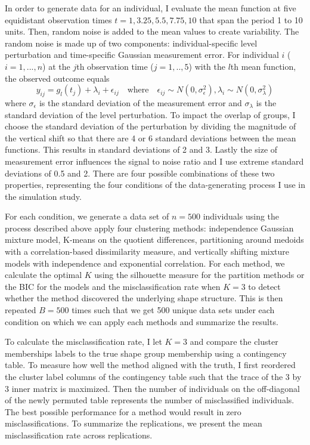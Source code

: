 \documentclass[12pt]{article}
\begin{document}
In order to generate data for an individual, I evaluate the mean function at five equidistant observation times $t=1,3.25,5.5,7.75,10$ that span the period 1 to 10 units. Then,  random noise is added to the mean values to create variability. The random noise is made up of two components: individual-specific level perturbation and time-specific Gaussian measurement error. For individual $i$ ($i=1,...,n$) at the $j$th observation time ($j=1,..,5$) with the $l$th mean function, the observed outcome equals
$$y_{ij} = g_{l}(t_{j})+\lambda_{i}+\epsilon_{ij}\quad\text{where}\quad \epsilon_{ij}\sim N(0,\sigma_{\epsilon}^{2}), \lambda_{i}\sim N(0,\sigma_{\lambda}^{2})$$
where $\sigma_{\epsilon}$  is the standard deviation of the measurement error and $\sigma_{\lambda}$ is the standard deviation of the level perturbation. To impact the overlap of groups, I choose the standard deviation of the perturbation by dividing the magnitude of the vertical shift so that there are 4 or 6 standard deviations between the mean functions. This results in standard deviations of 2 and 3. Lastly the size of measurement error influences the signal to noise ratio and I use extreme standard deviations of 0.5 and 2. There are four possible combinations of these two properties, representing the four  conditions of the data-generating process I use in the simulation study. 

For each condition, we generate a data set of $n=500$ individuals using the process described above apply four clustering methods: independence Gaussian mixture model, K-means on the quotient differences, partitioning around medoids with a correlation-based dissimilarity measure, and vertically shifting mixture models with independence and exponential correlation. For each method, we calculate the optimal $K$ using the silhouette measure \cite{kaufman}  for the partition methods or the BIC \cite{schartz} for the models and the misclassification rate when $K=3$ to detect whether the method discovered the underlying shape structure. This is then repeated $B=500$ times such that we get 500 unique data sets under each condition on which we can apply each methods and summarize the results. 

To calculate the misclassification rate, I let $K=3$ and compare the cluster memberships labels to the true shape group membership using a contingency table. To measure how well the method aligned with the truth, I first reordered the cluster label columns of the contingency table such that the trace of the 3 by 3 inner matrix is maximized. Then the number of individuals on the off-diagonal of the newly permuted table represents the number of misclassified individuals. The best possible performance for a method would result in zero misclassifications. To summarize the replications, we present the mean misclassification rate across replications.
\end{document}
